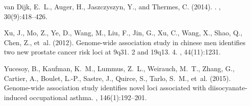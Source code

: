 \documentclass[9pt,article]{template}
\begin{document}
\begin{thebibliography}{}
van Dijk, E.~L., Auger, H., Jaszczyszyn, Y., and Thermes, C. (2014).
.
, 30(9):418--426.

Xu, J., Mo, Z., Ye, D., Wang, M., Liu, F., Jin, G., Xu, C., Wang, X., Shao, Q.,
  Chen, Z., et~al. (2012).
\newblock Genome-wide association study in chinese men identifies two new
  prostate cancer risk loci at 9q31. 2 and 19q13. 4.
, 44(11):1231.

Yucesoy, B., Kaufman, K.~M., Lummus, Z.~L., Weirauch, M.~T., Zhang, G.,
  Cartier, A., Boulet, L.-P., Sastre, J., Quirce, S., Tarlo, S.~M., et~al.
  (2015).
\newblock Genome-wide association study identifies novel loci associated with
  diisocyanate-induced occupational asthma.
, 146(1):192--201.

\end{thebibliography}
\end{document}
